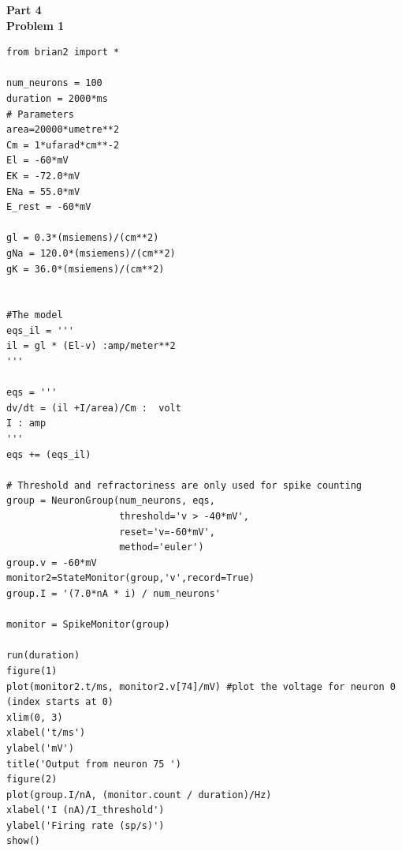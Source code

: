 \documentclass[12pt]{article}
\begin{document}
\normalsize\textbf{Part 4}
\\

\textbf{Problem 1}
\lstset{language=Python}
\begin{lstlisting}
from brian2 import *

num_neurons = 100
duration = 2000*ms
# Parameters
area=20000*umetre**2
Cm = 1*ufarad*cm**-2
El = -60*mV
EK = -72.0*mV
ENa = 55.0*mV
E_rest = -60*mV

gl = 0.3*(msiemens)/(cm**2)
gNa = 120.0*(msiemens)/(cm**2)
gK = 36.0*(msiemens)/(cm**2)


#The model
eqs_il = '''
il = gl * (El-v) :amp/meter**2
'''

eqs = '''
dv/dt = (il +I/area)/Cm :  volt
I : amp
'''
eqs += (eqs_il)

# Threshold and refractoriness are only used for spike counting
group = NeuronGroup(num_neurons, eqs,
                    threshold='v > -40*mV',
                    reset='v=-60*mV',
                    method='euler')
group.v = -60*mV
monitor2=StateMonitor(group,'v',record=True)
group.I = '(7.0*nA * i) / num_neurons'

monitor = SpikeMonitor(group)

run(duration)
figure(1)
plot(monitor2.t/ms, monitor2.v[74]/mV) #plot the voltage for neuron 0 (index starts at 0)
xlim(0, 3)
xlabel('t/ms')
ylabel('mV')
title('Output from neuron 75 ')
figure(2)
plot(group.I/nA, (monitor.count / duration)/Hz)
xlabel('I (nA)/I_threshold')
ylabel('Firing rate (sp/s)')
show()
\end{lstlisting}
\newpage
\end{document}
